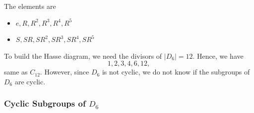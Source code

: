 The elements are \begin{itemize}
    \item $e, R, R^2, R^3, R^4, R^5$
    \item $S, SR, SR^2, SR^3, SR^4, SR^5$
\end{itemize}

To build the Hasse diagram, we need the divisors of $| D_6 | = 12$. Hence, we have \[
    1, 2, 3, 4, 6, 12,
\] same as $C_{12}$. However, since $D_6$ is not cyclic, we do not know if the subgroups of $D_6$ are cyclic.

\subsubsection{Cyclic Subgroups of $D_6$}




